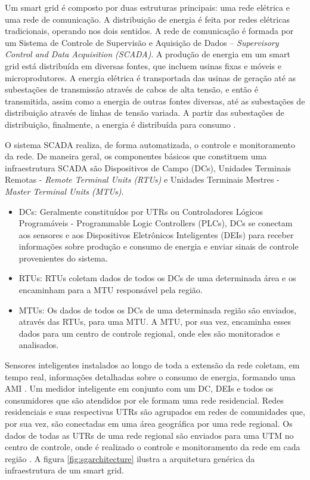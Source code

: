 \documentclass[cic,tc]{iiufrgs}
\begin{document}
Um smart grid é composto por duas estruturas principais: uma rede elétrica e uma rede de comunicação. A distribuição de energia é feita por redes elétricas tradicionais, operando nos dois sentidos. A rede de comunicação é formada por um Sistema de Controle de Supervisão e Aquisição de Dados – \textit{Supervisory Control and Data Acquisition (SCADA)}.
A produção de energia em um smart grid está distribuída em diversas fontes, que incluem usinas fixas e móveis e microprodutores. A energia elétrica é transportada das usinas de geração até as subestações de transmissão através de cabos de alta tensão, e então é transmitida, assim como a energia de outras fontes diversas, até as subestações de distribuição através de linhas de tensão variada. A partir das subestações de distribuição, finalmente, a energia é distribuída para consumo \cite{harb2013communication}.

O sistema SCADA realiza, de forma automatizada, o controle e monitoramento da rede. De maneira geral, os componentes básicos que constituem uma infraestrutura SCADA são Dispositivos de Campo (DCs), Unidades Terminais Remotas - \emph{Remote Terminal Units (RTUs)} e Unidades Terminais Mestres - \emph{Master Terminal Units (MTUs)}.

\begin{itemize}

\item{DCs}: Geralmente constituídos por UTRs ou Controladores Lógicos Programáveis - Programmable Logic Controllers (PLCs), DCs se conectam aos sensores e aos Dispositivos Eletrônicos Inteligentes (DEIs) para receber informações sobre produção e consumo de energia e enviar sinais de controle provenientes do sistema.
\item{RTUs}: RTUs  coletam dados de todos os DCs de uma determinada área e os encaminham para a MTU responsável pela região.
\item{MTUs}: Os dados de todos os DCs de uma determinada região são enviados, através das RTUs, para uma MTU. A MTU, por sua vez, encaminha esses dados para um centro de controle regional, onde eles são monitorados e analisados.
\end{itemize}

Sensores inteligentes instalados ao longo de toda a extensão da rede coletam, em tempo real, informações detalhadas sobre o consumo de energia, formando uma AMI \cite{2013survey}. Um medidor inteligente em conjunto com um DC, DEIs e todos os consumidores que são atendidos por ele formam uma rede residencial. Redes residenciais e suas respectivas UTRs são agrupados em redes de comunidades que, por sua vez, são conectadas em uma área geográfica por uma rede regional. Os dados de todas as UTRs de uma rede regional são enviados para uma UTM no centro de controle, onde é realizado o controle e monitoramento da rede em cada região \cite{li2012securing}. A figura \ref{fig:sgarchitecture} ilustra a arquitetura genérica da infraestrutura de um smart grid.
\end{document}
